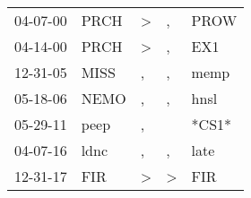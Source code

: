 \begin{supertabular}{lllll}
 04-07-00 &  PRCH &  \textgreater &             , &   PROW \\
 04-14-00 &  PRCH &  \textgreater &             , &    EX1 \\
 12-31-05 &  MISS &             , &             , &   memp \\
 05-18-06 &  NEMO &             , &             , &   hnsl \\
 05-29-11 &  peep &             , &               &  *CS1* \\
 04-07-16 &  ldnc &             , &             , &   late \\
 12-31-17 &   FIR &  \textgreater &  \textgreater &    FIR \\
\end{supertabular}
